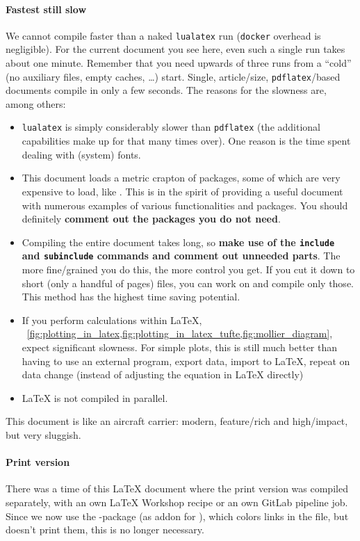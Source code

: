\paragraph{Fastest still slow}
We cannot compile faster than a naked \texttt{lualatex} run (\texttt{docker} overhead is negligible).
For the current document you see here, even such a single run takes about one minute.
Remember that you need upwards of three runs from a \enquote{cold} (no auxiliary files, empty caches, \dots{}) start.
Single, article\-/size, \texttt{pdflatex}\-/based documents compile in only a few seconds.
The reasons for the slowness are, among others:
\begin{itemize}
  \item \texttt{lualatex} is simply considerably slower than \texttt{pdflatex}
        (the additional capabilities make up for that many times over).
        One reason is the time spent dealing with (system) fonts.
  \item This document loads a metric crapton of packages, some of which are very expensive to load, like .
        This is in the spirit of providing a useful document with numerous examples of various functionalities and packages.
        You should definitely \textbf{\textcolor{mRed}{comment out the packages you do not need}}.
  \item Compiling the entire document takes long, so \textbf{\textcolor{mRed}{make use of the \texttt{include} and \texttt{subinclude}} commands and comment out unneeded parts}.
        The more fine\-/grained you do this, the more control you get.
        If you cut it down to short (only a handful of  pages) files, you can work on and compile only those.
        This method has the highest time saving potential.
  \item If you perform  calculations within \LaTeX{}, \ \cref{fig:plotting_in_latex,fig:plotting_in_latex_tufte,fig:mollier_diagram}, expect significant slowness.
        For simple plots, this is still much better than having to use an external program, export data, import to \LaTeX{}, repeat on data change (instead of adjusting the equation in \LaTeX{} directly) 
  \item \LaTeX{} is not compiled in parallel.
\end{itemize}
This document is like an aircraft carrier: modern, feature\-/rich and high\-/impact, but very sluggish.

\paragraph{Print version}
There was a time of this \LaTeX{} document where the print version was compiled separately, with an own \LaTeX{} Workshop recipe or an own GitLab pipeline job.
Since we now use the -package (as addon for ), which colors links in the  file, but doesn't print them, this is no longer necessary.

